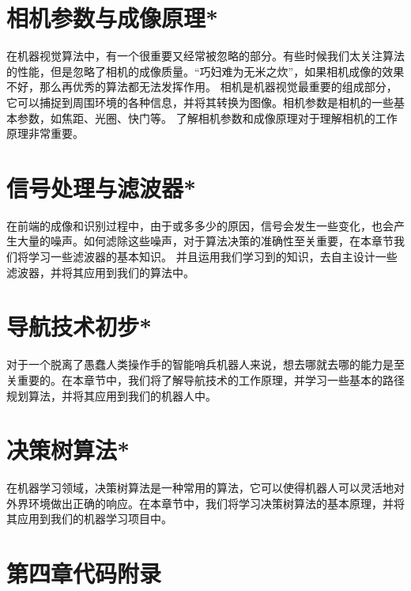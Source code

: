 \documentclass[withoutpreface,bwprint]{cumcmthesis} %
\begin{document}
\section{相机参数与成像原理*} 

在机器视觉算法中，有一个很重要又经常被忽略的部分。有些时候我们太关注算法的性能，但是忽略了相机的成像质量。“巧妇难为无米之炊”，如果相机成像的效果不好，那么再优秀的算法都无法发挥作用。
相机是机器视觉最重要的组成部分，它可以捕捉到周围环境的各种信息，并将其转换为图像。相机参数是相机的一些基本参数，如焦距、光圈、快门等。
了解相机参数和成像原理对于理解相机的工作原理非常重要。



\section{信号处理与滤波器*}
在前端的成像和识别过程中，由于或多多少的原因，信号会发生一些变化，也会产生大量的噪声。如何滤除这些噪声，对于算法决策的准确性至关重要，在本章节我们将学习一些滤波器的基本知识。
并且运用我们学习到的知识，去自主设计一些滤波器，并将其应用到我们的算法中。

\section{\quad 导航技术初步*}
对于一个脱离了愚蠢人类操作手的智能哨兵机器人来说，想去哪就去哪的能力是至关重要的。在本章节中，我们将了解导航技术的工作原理，并学习一些基本的路径规划算法，并将其应用到我们的机器人中。



\section{\quad 决策树算法*}
在机器学习领域，决策树算法是一种常用的算法，它可以使得机器人可以灵活地对外界环境做出正确的响应。在本章节中，我们将学习决策树算法的基本原理，并将其应用到我们的机器学习项目中。

\appendix
\section{第四章代码附录}


\end{document}

